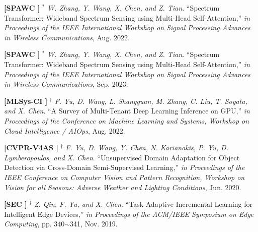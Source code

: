 


	\textbf{[SPAWC ]}
	$^\ast$
	\textsl{W. Zhang, Y. Wang, X. Chen, and Z. Tian}.
		``Spectrum Transformer: Wideband Spectrum Sensing using Multi-Head Self-Attention,''
		\textsl{in Proceedings of the IEEE International Workshop on Signal Processing Advances in Wireless Communications}, Aug. 2022.
			\vspace{-3mm}

	\textbf{[SPAWC ]}
	$^\ast$
	\textsl{W. Zhang, Y. Wang, X. Chen, and Z. Tian}.
		``Spectrum Transformer: Wideband Spectrum Sensing using Multi-Head Self-Attention,''
		\textsl{in Proceedings of the IEEE International Workshop on Signal Processing Advances in Wireless Communications}, Sep. 2023.
			\vspace{-3mm}

	\textbf{[MLSys-CI ]}
	$^\dagger$
	\textsl{F. Yu, D. Wang, L. Shangguan, M. Zhang, C. Liu, T. Soyata, and X. Chen}.
		``A Survey of Multi-Tenant Deep Learning Inference on GPU,''
		\textsl{in Proceedings of the Conference on Machine Learning and Systems, Workshop on Cloud Intelligence / AIOps}, Aug. 2022.
			\vspace{-3mm}

	\textbf{[CVPR-V4AS ]}
	$^\dagger$
	\textsl{F. Yu, D. Wang, Y. Chen, N. Karianakis, P. Yu, D. Lymberopoulos, and X. Chen}.
		``Unsupervised Domain Adaptation for Object Detection via Cross-Domain Semi-Supervised Learning,''
		\textsl{in Proceedings of the IEEE Conference on Computer Vision and Pattern Recognition, Workshop on Vision for all Seasons: Adverse Weather and Lighting Conditions}, Jun. 2020.
			\vspace{-3mm}

	\textbf{[SEC ]}
	$^\dagger$
	\textsl{Z. Qin, F. Yu, and X. Chen}.
		``Task-Adaptive Incremental Learning for Intelligent Edge Devices,''
		\textsl{in Proceedings of the ACM/IEEE Symposium on Edge Computing}, pp. 340$\sim$341, Nov. 2019.
			\vspace{-3mm}

